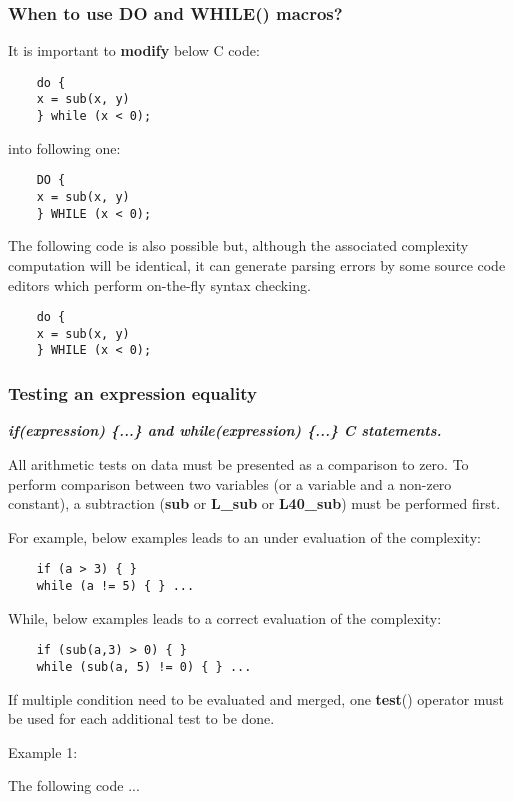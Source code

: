 \subsubsection{When to use DO and WHILE() macros?}
It is important to \textbf{modify} below C code:
{\small
\begin{verbatim}
    do {
    x = sub(x, y)
    } while (x < 0);
\end{verbatim}}
into following one: \\
{\small
\begin{verbatim}
    DO {
    x = sub(x, y)
    } WHILE (x < 0);
\end{verbatim}}

The following code is also possible but, although the associated
complexity computation will be identical, it can generate parsing
errors by some source code editors which perform on-the-fly syntax
checking.
{\small
\begin{verbatim}
    do {
    x = sub(x, y)
    } WHILE (x < 0);
\end{verbatim}}

\subsubsection {Testing an expression equality}

\textbf{\emph{if(expression) \{...\} and while(expression) \{...\}
C statements.}}

All arithmetic tests on data must be presented as a comparison to
zero. To perform comparison between two variables (or a variable
and a non-zero constant), a subtraction (\textbf{sub} or
\textbf{L\_sub} or \textbf{L40\_sub}) must be performed first.

For example, below examples leads to an under evaluation of the
complexity:
{\small
\begin{verbatim}
    if (a > 3) { }
    while (a != 5) { } ...
\end{verbatim}}

While, below examples leads to a correct evaluation of the
complexity:
{\small
\begin{verbatim}
    if (sub(a,3) > 0) { }
    while (sub(a, 5) != 0) { } ...
\end{verbatim}}

If multiple condition need to be evaluated and merged, one
\textbf{test}() operator must be used for each additional test to be
done.

Example 1:

The following code ...

